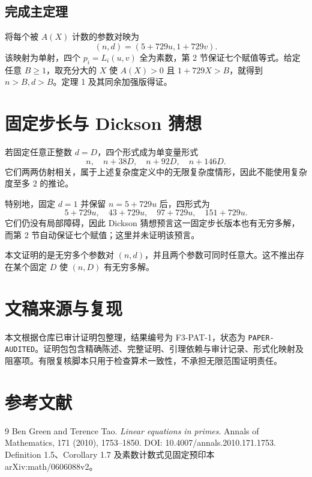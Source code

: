 \documentclass[11pt,a4paper]{ctexart}
\begin{document}
\subsection{完成主定理}
将每个被 $A(X)$ 计数的参数对映为
\[
(n,d)=(5+729u,1+729v).
\]
该映射为单射，四个 $p_i=L_i(u,v)$ 全为素数，第 2 节保证七个赋值等式。给定任意 $B\ge1$，取充分大的 $X$ 使 $A(X)>0$ 且 $1+729X>B$，就得到 $n>B,d>B$。定理 1 及其同余加强版得证。

\section{固定步长与 Dickson 猜想}
若固定任意正整数 $d=D$，四个形式成为单变量形式
\[
n,\quad n+38D,\quad n+92D,\quad n+146D.
\]
它们两两仿射相关，属于上述复杂度定义中的无限复杂度情形，因此不能使用复杂度至多 $2$ 的推论。

特别地，固定 $d=1$ 并保留 $n=5+729u$ 后，四形式为
\[
5+729u,\quad43+729u,\quad97+729u,\quad151+729u.
\]
它们仍没有局部障碍，因此 Dickson 猜想预言这一固定步长版本也有无穷多解，而第 2 节自动保证七个赋值；这里并未证明该预言。

本文证明的是无穷多个参数对 $(n,d)$，并且两个参数可同时任意大。这不推出存在某个固定 $D$ 使 $(n,D)$ 有无穷多解。

\section*{文稿来源与复现}
本文根据仓库已审计证明包整理，结果编号为 F3-PAT-1，状态为 \texttt{PAPER-AUDITED}。证明包包含精确陈述、完整证明、引理依赖与审计记录、形式化映射及阻塞项。有限复核脚本只用于检查算术一致性，不承担无限范围证明责任。

\section*{参考文献}
\begin{thebibliography}{9}
 Ben Green and Terence Tao. \emph{Linear equations in primes}. Annals of Mathematics, 171 (2010), 1753--1850. DOI: 10.4007/annals.2010.171.1753. Definition 1.5、Corollary 1.7 及素数计数式见固定预印本 arXiv:math/0606088v2。
\end{thebibliography}
\end{document}
